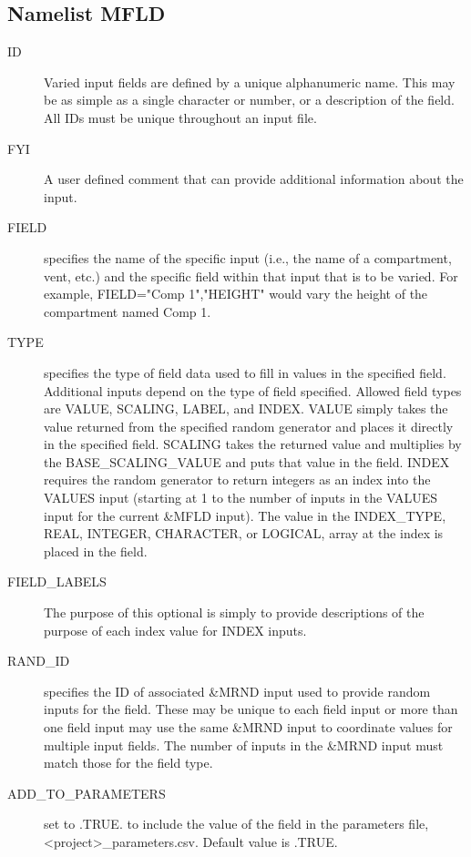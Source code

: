 \documentclass[12pt,twoside]{book}
\begin{document}
\subsection{Namelist MFLD}

\begin{description}
  \item[ID] Varied input fields are defined by a unique alphanumeric name. This may be as simple as a single character or number, or a description of the field. All IDs must be unique throughout an input file.
  \item[FYI] A user defined comment that can provide additional information about the input.
  \item[FIELD] specifies the name of the specific input (i.e., the name of a compartment, vent, etc.) and the specific field within that input that is to be varied. For example, {\ct FIELD="Comp 1","HEIGHT"} would vary the height of the compartment named {\ct Comp 1}.
  \item[TYPE] specifies the type of field data used to fill in values in the specified field. Additional inputs depend on the type of field specified. Allowed field types are {\ct VALUE}, {\ct SCALING}, {\ct LABEL}, and {\ct INDEX}. {\ct VALUE} simply takes the value returned from the specified random generator and places it directly in the specified field. {\ct SCALING} takes the returned value and multiplies by the {\ct BASE\_SCALING\_VALUE} and puts that value in the field. {\ct INDEX} requires the random generator to return integers as an index into the {\ct VALUES} input (starting at 1 to the number of inputs in the {\ct VALUES}       input for the current {\ct \&MFLD} input). The value in the {\ct INDEX\_TYPE}, {\ct REAL}, {\ct INTEGER}, {\ct CHARACTER}, or {\ct LOGICAL}, array at the index is placed in the field.
  \item[FIELD\_LABELS] The purpose of this optional is simply to provide descriptions of the purpose of each index value for {\ct INDEX} inputs.
  \item[RAND\_ID] specifies the ID of associated {\ct \&MRND} input used to provide random inputs for the field. These may be unique to each field input or more than one field input may use the same {\ct \&MRND} input to coordinate values for multiple input fields. The number of inputs in the {\ct \&MRND} input must match those for the field type.
  \item[ADD\_TO\_PARAMETERS] set to .TRUE. to include the value of the field in the parameters file, {\ct <project>\_parameters.csv}. Default value is .TRUE.

\end{description}
\end{document}
